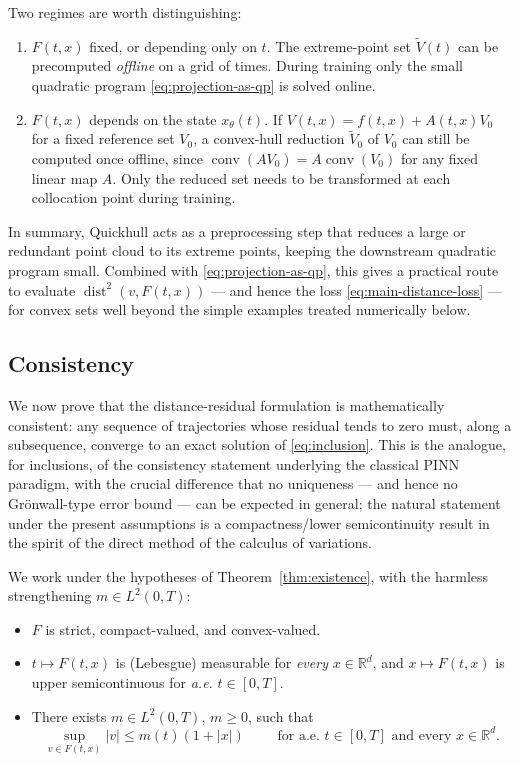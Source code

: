 \documentclass[11pt]{elsarticle}
\theoremstyle{definition}
\theoremstyle{remark}
\numberwithin{equation}{section}
\def\dist{\operatorname{dist}}
\begin{document}
	Two regimes are worth distinguishing:
	\begin{enumerate}
		\item $F(t,x)$ fixed, or depending only on $t$.
		The extreme-point set $\widetilde{V}(t)$ can be precomputed
		\emph{offline} on a grid of times.  During training only the small
		quadratic program \eqref{eq:projection-as-qp} is solved online.
		\item $F(t,x)$ depends on the state $x_\theta(t)$.
		If $V(t,x)=f(t,x)+A(t,x)V_0$ for a fixed reference set $V_0$, a
		convex-hull reduction $\widetilde{V}_0$ of $V_0$ can still be
		computed once offline, since $\operatorname{conv}(AV_0)=A\operatorname{conv}(V_0)$
		for any fixed linear map $A$.  Only the reduced set needs to be
		transformed at each collocation point during training.
	\end{enumerate}
	
	In summary, Quickhull acts as a preprocessing step that reduces a large
	or redundant point cloud to its extreme points, keeping the downstream
	quadratic program small.  Combined with \eqref{eq:projection-as-qp},
	this gives a practical route to evaluate $\dist^2(v,F(t,x))$ --- and
	hence the loss \eqref{eq:main-distance-loss} --- for convex sets well
	beyond the simple examples treated numerically below.
	
	\subsection{Consistency}
	\label{subsec:consistency}
	
	We now prove that the distance-residual formulation is mathematically
	consistent: any sequence of trajectories whose residual tends to zero
	must, along a subsequence, converge to an exact solution of
	\eqref{eq:inclusion}.  This is the analogue, for inclusions, of the
	consistency statement underlying the classical PINN paradigm, with the
	crucial difference that no uniqueness --- and hence no Gr\"onwall-type
	error bound --- can be expected in general; the natural statement under
	the present assumptions is a compactness/lower semicontinuity result in
	the spirit of the direct method of the calculus of variations.
	
	We work under the hypotheses of Theorem~\ref{thm:existence}, with the
	harmless strengthening $m\in L^2(0,T)$:
	
	\begin{itemize}
		\item[(H1)] $F$ is strict, compact-valued, and convex-valued.
		\item[(H2)] $t\mapsto F(t,x)$ is (Lebesgue) measurable for \emph{every}
		$x\in\mathbb{R}^d$, and $x\mapsto F(t,x)$ is upper semicontinuous for
		\emph{a.e.} $t\in[0,T]$.
		\item[(H3)] There exists $m\in L^2(0,T)$, $m\ge0$, such that
		\[
		\sup_{v\in F(t,x)}|v|\le m(t)(1+|x|) \qquad  
		\text{ for a.e. } t\in[0,T] \text{ and every } x\in\mathbb{R}^d.
		\]
	\end{itemize}
	
\end{document}
